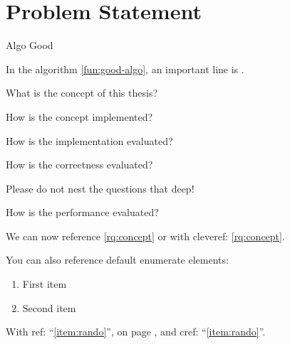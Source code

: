 \section{Problem Statement}

\begin{pseudo}[tbp]
	\caption{Algo Good}
	\label{fun:good-algo}
	\begin{algorithm}[H]
		\PreCode
		
		\StartCode
	\end{algorithm}
\end{pseudo}

In the  algorithm \cref{fun:good-algo}, an important line is .

\begin{rqs}
   \item \label{rq:concept} What is the concept of this thesis?
   \item \label{rq:implementation} How is the concept implemented?
   \item \label{rq:evaluation} How is the implementation evaluated?
   \begin{rqs}
      \item \label{rq:evaluation:correctness} How is the correctness evaluated? \begin{rqs}
         \item Please do not nest the questions that deep!
      \end{rqs}
      \item \label{rq:evaluation:performance} How is the performance evaluated?
   \end{rqs}
\end{rqs}

We can now reference \ref{rq:concept} or with cleveref: \cref{rq:concept}.

You can also reference default enumerate elements:

\begin{enumerate}
   \item \label{item:rando}First item
   \item Second item
\end{enumerate}

With ref: \enquote{\ref{item:rando}}, on page \pageref{item:rando}, and cref: \enquote{\cref{item:rando}}. 

